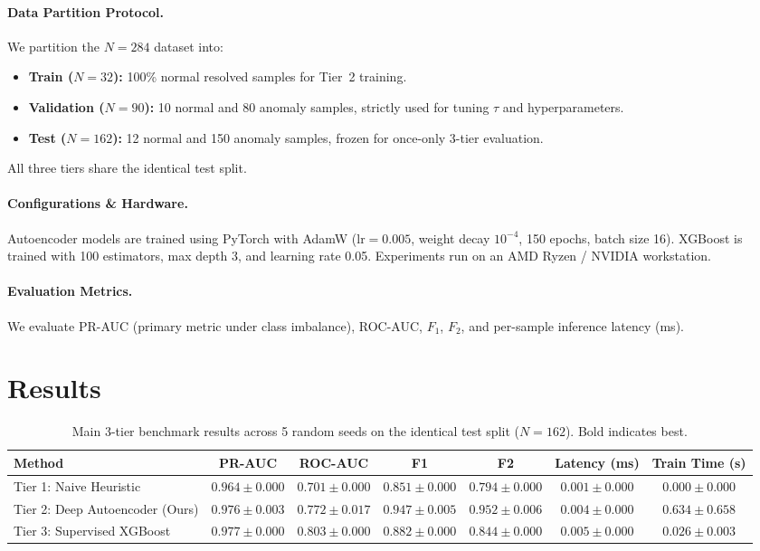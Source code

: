 \documentclass[11pt]{article}
\begin{document}
\paragraph{Data Partition Protocol.}
We partition the $N=284$ dataset into:
\begin{itemize}
    \item \textbf{Train ($N=32$):} 100\% normal resolved samples for Tier~2 training.
    \item \textbf{Validation ($N=90$):} 10 normal and 80 anomaly samples, strictly used for tuning $\tau$ and hyperparameters.
    \item \textbf{Test ($N=162$):} 12 normal and 150 anomaly samples, frozen for once-only 3-tier evaluation.
\end{itemize}
All three tiers share the identical test split.

\paragraph{Configurations \& Hardware.}
Autoencoder models are trained using PyTorch with AdamW ($\text{lr}=0.005$, weight decay $10^{-4}$, 150 epochs, batch size 16). XGBoost is trained with 100 estimators, max depth 3, and learning rate 0.05. Experiments run on an AMD Ryzen / NVIDIA workstation.

\paragraph{Evaluation Metrics.}
We evaluate PR-AUC (primary metric under class imbalance), ROC-AUC, $F_1$, $F_2$, and per-sample inference latency (ms).

\section{Results}\label{sec:results}

\begin{table}[t]
\centering
\small
\begin{tabular}{lcccccc}
\toprule
\textbf{Method} & \textbf{PR-AUC} & \textbf{ROC-AUC} & \textbf{F1} & \textbf{F2} & \textbf{Latency (ms)} & \textbf{Train Time (s)} \\
\midrule
Tier 1: Naive Heuristic & $0.964 \pm 0.000$ & $0.701 \pm 0.000$ & $0.851 \pm 0.000$ & $0.794 \pm 0.000$ & $\mathbf{0.001 \pm 0.000}$ & $\mathbf{0.000 \pm 0.000}$ \\
Tier 2: Deep Autoencoder (Ours) & $\mathbf{0.976 \pm 0.003}$ & $0.772 \pm 0.017$ & $\mathbf{0.947 \pm 0.005}$ & $\mathbf{0.952 \pm 0.006}$ & $0.004 \pm 0.000$ & $0.634 \pm 0.658$ \\
Tier 3: Supervised XGBoost & $0.977 \pm 0.000$ & $\mathbf{0.803 \pm 0.000}$ & $0.882 \pm 0.000$ & $0.844 \pm 0.000$ & $0.005 \pm 0.000$ & $0.026 \pm 0.003$ \\
\bottomrule
\end{tabular}
\caption{Main 3-tier benchmark results across 5 random seeds on the identical test split ($N=162$). Bold indicates best.}
\label{tab:main_results}
\end{table}
\end{document}
